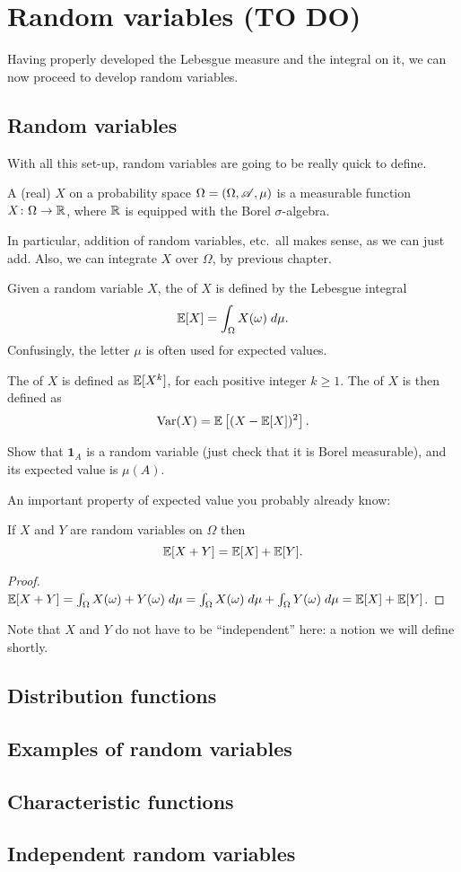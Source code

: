 \chapter{Random variables (TO DO)}
Having properly developed the Lebesgue measure
and the integral on it,
we can now proceed to develop random variables.

\section{Random variables}
With all this set-up, random variables are going to be really quick to define.
\begin{definition}
	A (real)  $X$ on a probability space
	$\Omega = (\Omega, \mathscr A, \mu)$
	is a measurable function $X \colon \Omega \to \mathbb R$,
	where $\mathbb R$ is equipped with the Borel $\sigma$-algebra.
\end{definition}
In particular, addition of random variables, etc.\
all makes sense, as we can just add.
Also, we can integrate $X$ over $\Omega$, by previous chapter.

\begin{definition}
	Given a random variable $X$,
	the  of $X$ is defined by
	the Lebesgue integral
	\[ \mathbb E[X] = \int_{\Omega} X(\omega) \; d\mu. \]
	Confusingly, the letter $\mu$ is often used for expected values.

	The  of $X$ is defined as $\mathbb E[X^k]$,
	for each positive integer $k \ge 1$.
	The  of $X$ is then defined as
	\[ \operatorname{Var}(X) = \mathbb E\left[ (X-\mathbb E[X])^2 \right]. \]
\end{definition}
\begin{ques}
	Show that $\mathbf{1}_A$ is a random variable
	(just check that it is Borel measurable),
	and its expected value is $\mu(A)$.
\end{ques}

An important property of expected value you probably already know:
\begin{theorem}
	If $X$ and $Y$ are random variables on $\Omega$ then
	\[ \mathbb E[X+Y] = \mathbb E[X] + \mathbb E[Y]. \]
\end{theorem}
\begin{proof}
	$\mathbb E[X+Y] = \int_\Omega X(\omega) + Y(\omega) \; d\mu
	= \int_\Omega X(\omega) \; d\mu + \int_\Omega Y(\omega) \; d\mu
	= \mathbb E[X] + \mathbb E[Y]$.
\end{proof}
Note that $X$ and $Y$ do not have to be ``independent'' here:
a notion we will define shortly.

\section{Distribution functions}

\section{Examples of random variables}

\section{Characteristic functions}

\section{Independent random variables}


